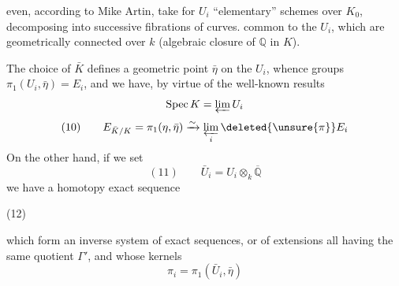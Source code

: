 even, according to Mike Artin, take for $U_i$ ``elementary'' schemes over $K_0$, decomposing into successive fibrations of curves.   common to the $U_i$, which are geometrically connected  over  $k$ (algebraic closure of $\mathbb Q$ in $K$).

The choice of $\bar K$ defines a geometric point $\bar\eta$ on the $U_i$, whence groups $\pi_1(U_i,\bar\eta)=E_i$, and we have, by virtue of the well-known results
\[
\operatorname{Spec}K=\varprojlim U_i
\]
\[
(10)\qquad E_{\bar K/K}=\pi_1(\eta,\bar\eta)\xrightarrow{\sim}\varprojlim_i\deleted{\unsure{\pi}}E_i
\]
On the other hand, if we set
\[
(11)\qquad\bar U_i=U_i\otimes_k\overline{\mathbb Q}
\]
we have  a homotopy exact sequence

\noindent (12)\quad{}

which form an inverse system of exact sequences, or of extensions all having the same quotient $\Gamma'$, and whose kernels
\[
\pi_i=\pi_1(\bar U_i,\bar\eta)
\]
